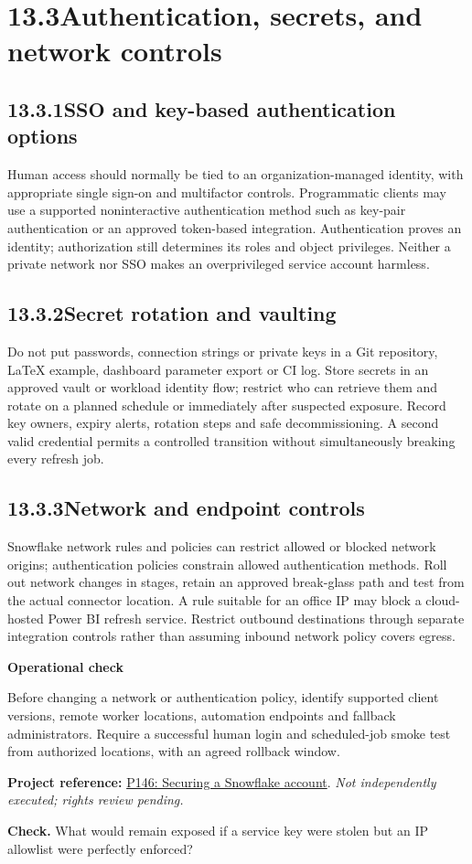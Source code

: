 \documentclass[11pt,twoside]{article}
\newcommand{\topic}[2]{\subsection*{#1\quad #2}}
\newcommand{\repo}[2]{\par\begingroup\fontsize{8.0}{9.6}\selectfont\sffamily\color{inkgray}\textbf{Project reference:} \href{#2}{#1}. \textit{Not independently executed; rights review pending.}\par\endgroup}
\begin{document}
\section*{13.3\quad Authentication, secrets, and network controls}
\topic{13.3.1}{SSO and key-based authentication options}
Human access should normally be tied to an organization-managed identity, with appropriate single sign-on and multifactor controls. Programmatic clients may use a supported noninteractive authentication method such as key-pair authentication or an approved token-based integration. Authentication proves an identity; authorization still determines its roles and object privileges. Neither a private network nor SSO makes an overprivileged service account harmless.
\topic{13.3.2}{Secret rotation and vaulting}
Do not put passwords, connection strings or private keys in a Git repository, LaTeX example, dashboard parameter export or CI log. Store secrets in an approved vault or workload identity flow; restrict who can retrieve them and rotate on a planned schedule or immediately after suspected exposure. Record key owners, expiry alerts, rotation steps and safe decommissioning. A second valid credential permits a controlled transition without simultaneously breaking every refresh job.
\topic{13.3.3}{Network and endpoint controls}
Snowflake network rules and policies can restrict allowed or blocked network origins; authentication policies constrain allowed authentication methods. Roll out network changes in stages, retain an approved break-glass path and test from the actual connector location. A rule suitable for an office IP may block a cloud-hosted Power BI refresh service. Restrict outbound destinations through separate integration controls rather than assuming inbound network policy covers egress.
\begin{whitebox}\textbf{Operational check}\par
Before changing a network or authentication policy, identify supported client versions, remote worker locations, automation endpoints and fallback administrators. Require a successful human login and scheduled-job smoke test from authorized locations, with an agreed rollback window.
\end{whitebox}
\repo{P146: Securing a Snowflake account}{https://github.com/sfc-gh-jbellegarde/securing-your-snowflake-account}
\textbf{Check.} What would remain exposed if a service key were stolen but an IP allowlist were perfectly enforced?
\newpage
\end{document}
